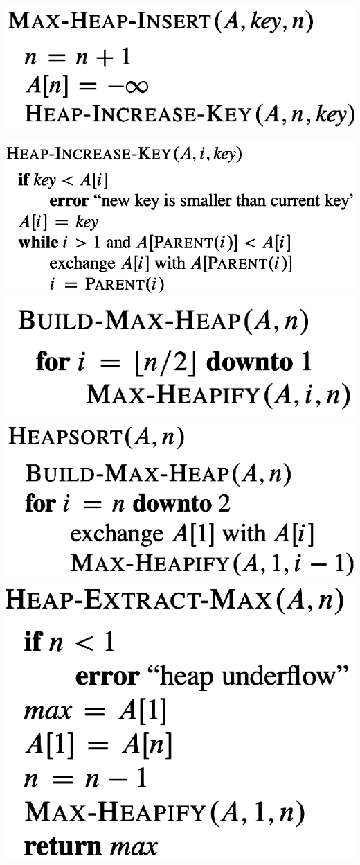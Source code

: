 {{\begin{minipage}[t]{0.35\textwidth}
        \vspace{6pt}
        
        \includegraphics[width=0.7\linewidth]{images/heap-insert.png}
        \vspace{6pt}
        
        \includegraphics[width=0.7\linewidth]{images/heap-increase-key.png}
        \vspace{6pt}
        \includegraphics[width=0.7\linewidth]{images/build-max-heap.png}
        \vspace{6pt}
        \includegraphics[width=0.7\linewidth]{images/heapsort.png}
        \vspace{6pt}
        \includegraphics[width=0.7\linewidth]{images/heap-extract-max.png}
    \end{minipage}
}} 